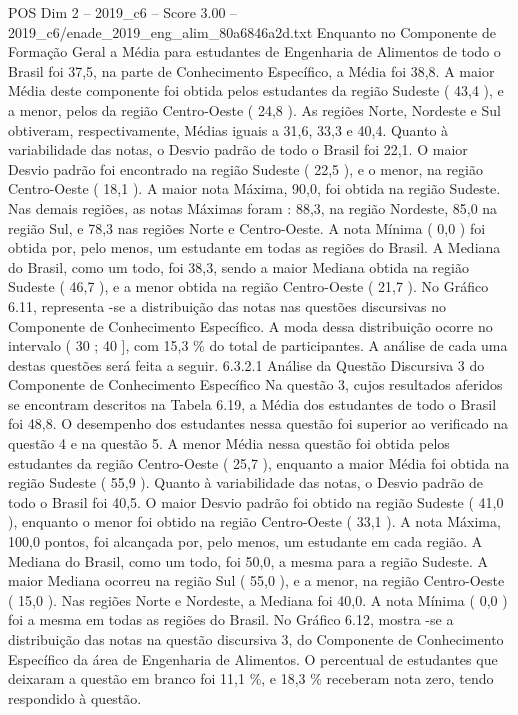 \begin{textsample}{POS Dim 2 – 2019\_c6 – Score 3.00 – 2019\_c6/enade\_2019\_eng\_alim\_80a6846a2d.txt}
Enquanto no Componente de Formação Geral a Média para estudantes de Engenharia de Alimentos de todo o Brasil foi 37,5, na parte de Conhecimento Específico, a Média foi 38,8.
A maior Média deste componente foi obtida pelos estudantes da região Sudeste ( 43,4 ), e a menor, pelos da região Centro-Oeste ( 24,8 ).
As regiões Norte, Nordeste e Sul obtiveram, respectivamente, Médias iguais a 31,6, 33,3 e 40,4.
Quanto à variabilidade das notas, o Desvio padrão de todo o Brasil foi 22,1.
O maior Desvio padrão foi encontrado na região Sudeste ( 22,5 ), e o menor, na região Centro-Oeste ( 18,1 ).
A maior nota Máxima, 90,0, foi obtida na região Sudeste.
Nas demais regiões, as notas Máximas foram : 88,3, na região Nordeste, 85,0 na região Sul, e 78,3 nas regiões Norte e Centro-Oeste.
A nota Mínima ( 0,0 ) foi obtida por, pelo menos, um estudante em todas as regiões do Brasil.
A Mediana do Brasil, como um todo, foi 38,3, sendo a maior Mediana obtida na região Sudeste ( 46,7 ), e a menor obtida na região Centro-Oeste ( 21,7 ).
No Gráfico 6.11, representa -se a distribuição das notas nas questões discursivas no Componente de Conhecimento Específico.
A moda dessa distribuição ocorre no intervalo ( 30 ; 40 ], com 15,3 \% do total de participantes.
A análise de cada uma destas questões será feita a seguir. 6.3.2.1 Análise da Questão Discursiva 3 do Componente de Conhecimento Específico Na questão 3, cujos resultados aferidos se encontram descritos na Tabela 6.19, a Média dos estudantes de todo o Brasil foi 48,8.
O desempenho dos estudantes nessa questão foi superior ao verificado na questão 4 e na questão 5.
A menor Média nessa questão foi obtida pelos estudantes da região Centro-Oeste ( 25,7 ), enquanto a maior Média foi obtida na região Sudeste ( 55,9 ).
Quanto à variabilidade das notas, o Desvio padrão de todo o Brasil foi 40,5.
O maior Desvio padrão foi obtido na região Sudeste ( 41,0 ), enquanto o menor foi obtido na região Centro-Oeste ( 33,1 ).
A nota Máxima, 100,0 pontos, foi alcançada por, pelo menos, um estudante em cada região.
A Mediana do Brasil, como um todo, foi 50,0, a mesma para a região Sudeste.
A maior Mediana ocorreu na região Sul ( 55,0 ), e a menor, na região Centro-Oeste ( 15,0 ).
Nas regiões Norte e Nordeste, a Mediana foi 40,0.
A nota Mínima ( 0,0 ) foi a mesma em todas as regiões do Brasil.
No Gráfico 6.12, mostra -se a distribuição das notas na questão discursiva 3, do Componente de Conhecimento Específico da área de Engenharia de Alimentos.
O percentual de estudantes que deixaram a questão em branco foi 11,1 \%, e 18,3 \% receberam nota zero, tendo respondido à questão.

\end{textsample}
